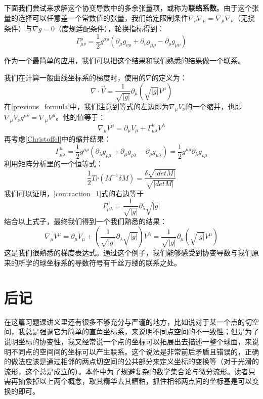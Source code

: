 \documentclass[UTF-8]{article}
\begin{document}
下面我们尝试来求解这个协变导数中的多余张量项，或称为\textbf{联络系数}。由于这个张量的选择可以任意差一个常数值的张量，我们给定限制条件$\nabla_{\nu}\nabla_{\mu} = \nabla_{\mu}\nabla_{\nu}$（无挠条件）与$\nabla g = 0$（度规适配条件），轮换指标得到：
\begin{equation}
	\Gamma^{\rho}_{ \mu\nu} = \frac{1}{2} g^{\sigma\rho}(\partial_{\mu}g_{\nu\rho}+\partial_{\nu}g_{\mu\rho}-\partial_{\rho}g_{\mu\nu})
	\label{Christoffel} 
\end{equation}

作为一个最简单的应用，我们可以把这个结果和我们熟悉的结果做一个联系。

我们在计算一般曲线坐标系的梯度时，使用的$\nabla$的定义为：
\begin{equation}
	\nabla\cdot\vec{V} = \frac{1}{\sqrt{|g|}}\partial_{\mu}(\sqrt{|g|}V^{\mu})
	\label{previous_formula}
\end{equation}
在\ref{previous_formula}中，我们注意到等式的左边即为$\nabla_{\mu} V_{\nu}$的一个缩并，也即$\nabla_{\mu} V_{\nu} g^{\mu\nu} = \nabla_{\mu} V^{\mu}$。他的值等于：
\begin{equation}
	\nabla_{\mu} V^{\mu} = \partial_{\mu} V_{\mu} + \Gamma^{\mu}_{ \mu\lambda} V^{\lambda}
\end{equation}
再考虑\ref{Christoffel}中的缩并结果：
\begin{equation}
	\Gamma^{\mu}_{ \mu\lambda} = \frac{1}{2}g^{\mu\rho}(\partial_{\lambda}g_{\rho\mu}+\partial_{\mu}g_{\rho\lambda} - \partial_{\rho}g_{\mu\lambda}) = \frac{1}{2} g^{\mu\rho} \partial_{\lambda} g_{\rho\mu}
	\label{contraction_1}
\end{equation}
利用矩阵分析里的一个恒等式：
\begin{equation}
	\frac{1}{2}Tr(M^{-1} \delta M) = \frac{\delta \sqrt{|detM|}}{\sqrt{|detM|}}
	\label{identity}
\end{equation}
我们可以证明，\ref{contraction_1}式的右边等于
\begin{equation}
	\Gamma^{\mu}_{\mu\lambda} = \frac{1}{\sqrt{|g|}}\partial_{\lambda} \sqrt{|g|}
\end{equation}
结合以上式子，最终我们得到一个我们熟悉的结果：
\begin{equation}
	\nabla_{\mu} V^{\mu} = \partial_{\mu} V_{\mu} + (\frac{1}{\sqrt{|g|}}\partial_{\lambda} \sqrt{|g|}) V^{\lambda} = \frac{1}{\sqrt{|g|}}\partial_{\mu}(\sqrt{|g|}V^{\mu})
\end{equation}
这是我们很熟悉的梯度表达式。通过这个例子，我们能够感受到协变导数与我们原来的所学的球坐标系的导数符号有千丝万缕的联系之处。


\section{后记}
在这篇习题课讲义里还有很多不够充分与严谨的地方，比如说对于某一个点的切空间，我总是强调它为简单的直角坐标系，来说明不同点空间的不一致性；但是为了说明坐标的协变性，我又经常说一个点的坐标可以拓展出去描述一整个球面，来说明不同点的空间间的坐标可以产生联系。这个说法是非常前后矛盾且错误的，正确的做法应该是通过相邻的两点切空间的公共部分来定义坐标的变换等（对于光滑的流形，这个总是成立的）。本作中为了规避复杂的数学集合论与微分流形。读者只需再抽象掉以上两个概念，取其精华去其糟粕，抓住相邻两点间的坐标基是可以变换的即可。


\end{document}
